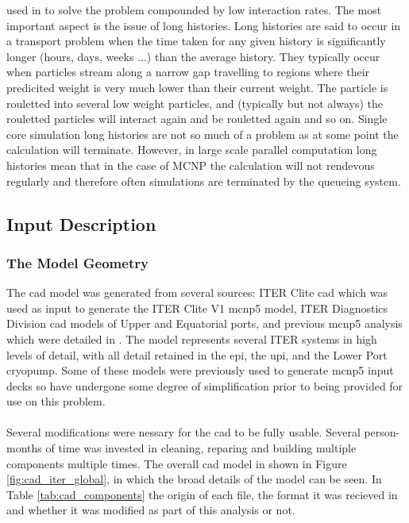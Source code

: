 \documentclass[12pt]{article}
\begin{document}
used in to solve the problem compounded by low interaction rates. The most 
important aspect is the issue of long histories. Long histories are said to 
occur in a transport problem when the time taken for any given history is 
significantly longer (hours, days, weeks ...) than the average history. They 
typically occur when particles stream along a narrow gap travelling to regions
where their predicited weight is very much lower than their current weight. The 
particle is rouletted into several low weight particles, and (typically but not
always) the rouletted particles will interact again and be rouletted again and 
so on. Single core  simulation long histories are not so much of a problem as 
at some point the calculation will terminate. However, in large scale parallel 
computation long histories mean that in the case of MCNP the calculation will
not rendevous regularly and therefore often simulations are terminated by the 
queueing system. 


\subsection{Input Description}
\subsubsection{The Model Geometry}
The \gls{cad} model was generated from several sources: ITER Clite \gls{cad}
which was used as input to generate the ITER Clite V1 \gls{mcnp5} model, ITER
Diagnostics Division \gls{cad} models of Upper and Equatorial ports, and
previous \gls{mcnp5} analysis which were detailed in \cite{cad_origination}. The
model represents several ITER systems in high levels of detail, with all detail
retained in the \gls{epi}, the  \gls{upi}, and the Lower Port cryopump. Some of
these models were previously used to generate \gls{mcnp5} input decks so have
undergone some degree of simplification prior to being provided for use on this 
problem.
\\
\\
Several modifications were nessary for the \gls{cad} to be fully usable. Several
person-months of time was invested in cleaning, reparing and building multiple
components multiple times. The overall \gls{cad} model in shown in Figure 
\ref{fig:cad_iter_global}, in which the broad details of the model can be seen. In
Table \ref{tab:cad_components} the origin of each file, the format it was recieved
in and whether it was modified as part of this analysis or not.
\end{document}
